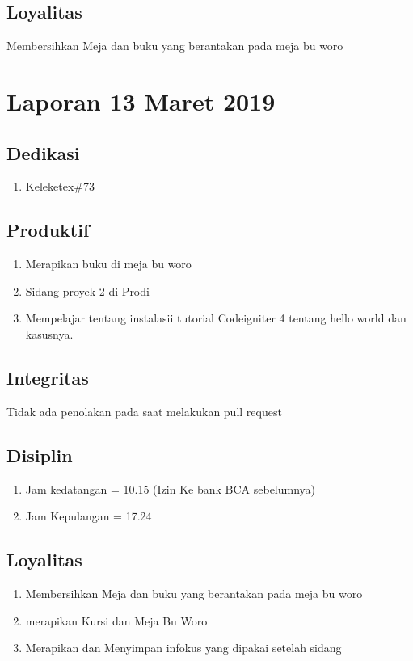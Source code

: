 \subsection{Loyalitas}
 Membersihkan Meja dan buku yang berantakan pada meja bu woro


\section{Laporan 13 Maret 2019}
\subsection{Dedikasi}
\begin{enumerate}
\item Keleketex\#73
\end{enumerate}
\subsection{Produktif}
\begin{enumerate}
\item Merapikan buku di meja bu woro
\item Sidang proyek 2 di Prodi
\item Mempelajar tentang instalasii tutorial Codeigniter 4 tentang hello world dan kasusnya.
\end{enumerate}
\subsection{Integritas}
Tidak ada penolakan pada saat melakukan pull request
\subsection{Disiplin}
\begin{enumerate}
\item Jam kedatangan =  10.15 (Izin Ke bank BCA sebelumnya)
\item Jam Kepulangan = 17.24
\end{enumerate}
\subsection{Loyalitas}
\begin{enumerate}
\item Membersihkan Meja dan buku yang berantakan pada meja bu woro
\item merapikan Kursi dan Meja Bu Woro
\item Merapikan dan Menyimpan infokus yang dipakai setelah sidang
\end{enumerate}
